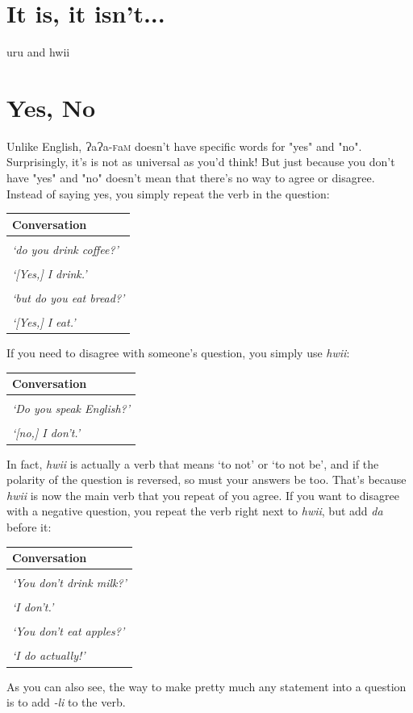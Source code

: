 \documentclass[a5paper,10pt,twoside,openright]{memoir}
\renewcommand{\arraystretch}{1.4}
\newcommand{\lang}{ɁaɁa-\textsc{f}a\textsc{m}}
\newcommand{\lilglot}{ɂ}
\newcommand\famword[1]{{\addfontfeatures{Letters=UppercaseSmallCaps}#1}}
\newcommand{\convowidth}{0.862\textwidth}
\newenvironment{conversation}
    {\renewcommand{\arraystretch}{0.75}
    \begin{table}[ht]
        \centering
        \begin{tabular}{p{\convowidth}}
        \toprule
        \textbf{Conversation} \\
        \midrule
    }
    { 
        \bottomrule
        \end{tabular}
    \end{table}
    \renewcommand{\arraystretch}{1.4}
    }
\newcommand{\diagline}[3]{\hspace{1em} 

\begin{minipage}[c][1cm][t]{\convowidth}
    \textbf{\uppercase{#1:}} \famword{#2} \\
    \textit{`#3'}
\end{minipage} \\}
\begin{document}
\chapter{It is, it isn't...}

uru and hwii



\chapter{Yes, No}

Unlike English, \lang{} doesn't have specific words for "yes" and "no". Surprisingly, it's is not as universal as you'd think! But just because you don't have "yes" and "no" doesn't mean that there's no way to agree or disagree. Instead of saying yes, you simply repeat the verb in the question:

\begin{conversation}
    \diagline{a}{\famword{mi QarFi KiiLli?}}{do you drink coffee?}
    \diagline{b}{\famword{KiiL.}}{[Yes,] I drink.}
    \diagline{b}{\famword{mi da PurNi NiiMli?}}{but do you eat bread?}
    \diagline{a}{\famword{NiiM.}}{[Yes,] I eat.}
\end{conversation}

\newpage
If you need to disagree with someone's question, you simply use \emph{hwii}:

\begin{conversation}
    \diagline{a}{\famword{mi SeHaNa-FaM FiiMli?}}{Do you speak English?}
    \diagline{b}{hwii.}{[no,] I don't.}
\end{conversation} 

In fact, \emph{hwii} is actually a verb that means `to not' or `to not be', and if the polarity of the question is reversed, so must your answers be too. That's because \emph{hwii} is now the main verb that you repeat of you agree. If you want to disagree with a negative question, you repeat the verb right next to \emph{hwii}, but add \emph{da} before it:

\begin{conversation}
    \diagline{a}{\famword{mi MarHi KiiLe\lilglot{} hwiili?}}{You don't drink milk?}
    \diagline{b}{hwii.}{I don't.}
    \diagline{a}{\famword{mi PurLi NiiMe\lilglot{} hwiili?}}{You don't eat apples?}
    \diagline{b}{\famword{da NiiM!}}{I do actually!}
\end{conversation}

As you can also see, the way to make pretty much any statement into a question is to add \emph{-li} to the verb. 
\end{document}
